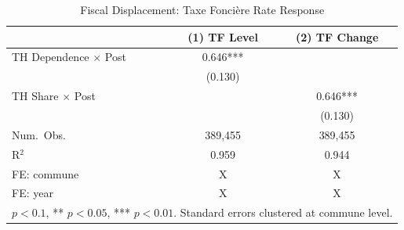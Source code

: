 \begin{table}[htbp]
\centering
\caption{Fiscal Displacement: Taxe Fonci\`ere Rate Response}
\label{tab:fiscal}
\begin{tabular}{lcc}
\toprule
 & (1) TF Level & (2) TF Change \\
\midrule
TH Dependence $\times$ Post & 0.646*** &  \\
 & (0.130) &  \\
TH Share $\times$ Post &  & 0.646*** \\
 &  & (0.130) \\
\midrule
Num.\ Obs. & 389,455 & 389,455 \\
R$^2$ & 0.959 & 0.944 \\
FE: commune & X & X \\
FE: year & X & X \\
\bottomrule
\multicolumn{3}{l}{\footnotesize * $p < 0.1$, ** $p < 0.05$, *** $p < 0.01$. Standard errors clustered at commune level.}
\end{tabular}
\end{table}
